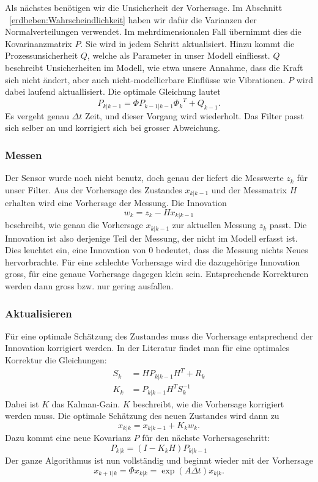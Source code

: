 Als nächstes benötigen wir die Unsicherheit der Vorhersage.
Im Abschnitt ~\ref{erdbeben:Wahrscheindlichkeit} haben wir dafür die Varianzen der Normalverteilungen verwendet.
Im mehrdimensionalen Fall übernimmt dies die Kovarinanzmatrix $P$.
Sie wird in jedem Schritt aktualisiert.
Hinzu kommt die Prozessunsicherheit $Q$, welche als Parameter in unser Modell einfliesst.
$Q$ beschreibt Unsicherheiten im Modell,
wie etwa unsere Annahme, dass die Kraft sich nicht ändert,
aber auch nicht-modellierbare Einflüsse wie Vibrationen.
$P$ wird dabei laufend aktuallisiert.
Die optimale Gleichung lautet
\[
{P_{k|k-1}}=\Phi {P_{k-1|k-1}} {\Phi _{k}}^T + {Q_{k-1}}.
\] 
Es vergeht genau $\Delta t$ Zeit, und dieser Vorgang wird wiederholt.  
Das Filter passt sich selber an und korrigiert sich bei grosser Abweichung.

\subsubsection*{Messen}
Der Sensor wurde noch nicht benutz, doch genau der liefert die Messwerte $z_k$ für unser Filter. 
Aus der Vorhersage des Zustandes $x_{k|k-1}$ und der Messmatrix $H$ erhalten wird eine Vorhersage der Messung. 
Die Innovation
\[
{w_{k}}={z_{k}}-{H}{x_{k|k-1}}
\] 
beschreibt, wie genau die Vorhersage $x_{k|k-1}$ zur aktuellen Messung $z_k$ passt. 
Die Innovation ist also derjenige Teil der Messung, der nicht im Modell erfasst ist.
Dies leuchtet ein, eine Innovation von $0$ bedeutet, dass die Messung nichts Neues hervorbrachte.
Für eine schlechte Vorhersage wird die dazugehörige Innovation gross, für eine genaue Vorhersage dagegen klein sein. 
Entsprechende Korrekturen werden dann gross bzw. nur gering ausfallen. 

\subsubsection*{Aktualisieren}

Für eine optimale Schätzung des Zustandes muss die Vorhersage entsprechend der Innovation korrigiert werden.
In der Literatur findet man für eine optimales Korrektur die Gleichungen:
\begin{align*}
{S_{k}} &={H}{P_{k|k-1}}{H}^T+{R_{k}}
\\
{K_{k}} &= {P_{k|k-1}} {H^T}{S_{k}^{-1}}
\end{align*}
Dabei ist $K$ das Kalman-Gain.
$K$ beschreibt, wie die Vorhersage korrigiert werden muss.
Die optimale Schätzung des neuen Zustandes wird dann zu
\[
{x_{k|k}}={x_{k|k-1}}+{K_{k}}{w_{k}}.
\] 
Dazu kommt eine neue Kovarianz $P$ für den nächste Vorhersageschritt:
\[
{P_{k|k}}=(I-{K_{k}}{H}){P_{k|k-1}} 
\] 
Der ganze Algorithmus ist nun vollständig und beginnt wieder mit der Vorhersage 
\[
{x_{k+1|k}}=\Phi{x_{k|k}}= \exp(A\Delta t){x_{k|k}}.
\] 


